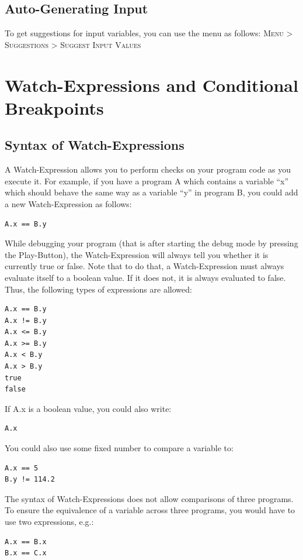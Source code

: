 \documentclass[parskip=full]{memoir}
\begin{document}
\section{Auto-Generating Input}
To get suggestions for input variables, you can use the menu as follows:
\textsc{Menu > Suggestions > Suggest Input Values}


\chapter{Watch-Expressions and Conditional Breakpoints}
\section{Syntax of Watch-Expressions}
A Watch-Expression allows you to perform checks on your program code as you execute it.
For example, if you have a program A which contains a variable \enquote{x} which should behave the same way as a variable \enquote{y} in program B, you could add a new Watch-Expression as follows:
\begin{verbatim}
A.x == B.y
\end{verbatim}

While debugging your program (that is after starting the debug mode by pressing the Play-Button), the Watch-Expression will always tell you whether it is currently true or false.
Note that to do that, a Watch-Expression must always evaluate itself to a boolean value. If it does not, it is always evaluated to false.
Thus, the following types of expressions are allowed:
\begin{verbatim}
A.x == B.y
A.x != B.y
A.x <= B.y
A.x >= B.y
A.x < B.y
A.x > B.y
true
false
\end{verbatim}

If A.x is a boolean value, you could also write:
\begin{verbatim}
A.x
\end{verbatim}

You could also use some fixed number to compare a variable to:
\begin{verbatim}
A.x == 5
B.y != 114.2
\end{verbatim}

The syntax of Watch-Expressions does not allow comparisons of three programs. To ensure the equivalence of a variable across three programs, you would have to use two expressions, e.g.:
\begin{verbatim}
A.x == B.x
B.x == C.x
\end{verbatim}
\end{document}
